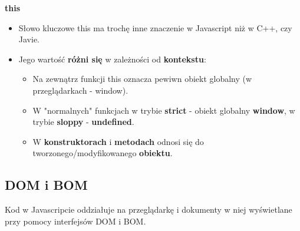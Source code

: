 \documentclass[../main.tex]{subfiles}
\begin{document}
    \textbf{this}
    \begin{itemize}
        \item Słowo kluczowe this ma trochę inne znaczenie w Javascript niż w C++, czy Javie.
        \item Jego wartość \textbf{różni się} w zależności od \textbf{kontekstu}:
        \begin{itemize}
            \item Na zewnątrz funkcji this oznacza pewiwn obiekt globalny (w przeglądarkach - window).
            \item W "normalnych" funkcjach w trybie \textbf{strict} - obiekt globalny \textbf{window}, w trybie \textbf{sloppy} - \textbf{undefined}.
            \item W \textbf{konstruktorach} i \textbf{metodach} odnosi się do tworzonego/modyfikowanego \textbf{obiektu}.
        \end{itemize}
    \end{itemize}


    \subsection{DOM i BOM}
    Kod w Javascripcie oddziałuje na przeglądarkę i dokumenty w niej wyświetlane przy pomocy interfejsów DOM i BOM.
\end{document}
